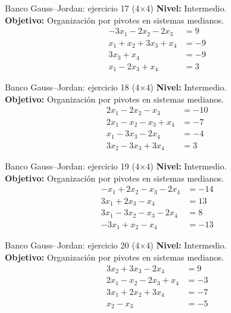 \documentclass[aspectratio=169,9pt]{beamer}
\theoremstyle{remark}
\begin{document}
\begin{frame}[t]{Banco Gauss--Jordan: ejercicio 17 (4$\times$4)}
\textbf{Nivel:} Intermedio.\\
\textbf{Objetivo:} Organización por pivotes en sistemas medianos.
\[
\begin{aligned}
- 3 x_{1} - 2 x_{2} - 2 x_{3} &= 9\\
x_{1} + x_{2} + 3 x_{3} + x_{4} &= -9\\
3 x_{3} + x_{4} &= -9\\
x_{1} - 2 x_{3} + x_{4} &= 3
\end{aligned}
\]
\end{frame}
\begin{frame}[t]{Banco Gauss--Jordan: ejercicio 18 (4$\times$4)}
\textbf{Nivel:} Intermedio.\\
\textbf{Objetivo:} Organización por pivotes en sistemas medianos.
\[
\begin{aligned}
2 x_{1} - 2 x_{2} - x_{3} &= -10\\
2 x_{1} - x_{2} - x_{3} + x_{4} &= -7\\
x_{1} - 3 x_{3} - 2 x_{4} &= -4\\
3 x_{2} - 3 x_{3} + 3 x_{4} &= 3
\end{aligned}
\]
\end{frame}
\begin{frame}[t]{Banco Gauss--Jordan: ejercicio 19 (4$\times$4)}
\textbf{Nivel:} Intermedio.\\
\textbf{Objetivo:} Organización por pivotes en sistemas medianos.
\[
\begin{aligned}
- x_{1} + 2 x_{2} - x_{3} - 2 x_{4} &= -14\\
3 x_{1} + 2 x_{3} - x_{4} &= 13\\
3 x_{1} - 3 x_{2} - x_{3} - 2 x_{4} &= 8\\
- 3 x_{1} + x_{2} - x_{4} &= -13
\end{aligned}
\]
\end{frame}
\begin{frame}[t]{Banco Gauss--Jordan: ejercicio 20 (4$\times$4)}
\textbf{Nivel:} Intermedio.\\
\textbf{Objetivo:} Organización por pivotes en sistemas medianos.
\[
\begin{aligned}
3 x_{2} + 3 x_{3} - 2 x_{4} &= 9\\
2 x_{1} - x_{2} - 2 x_{3} + x_{4} &= -3\\
3 x_{1} + 2 x_{2} + 3 x_{4} &= -7\\
x_{2} - x_{3} &= -5
\end{aligned}
\]
\end{frame}
\end{document}
